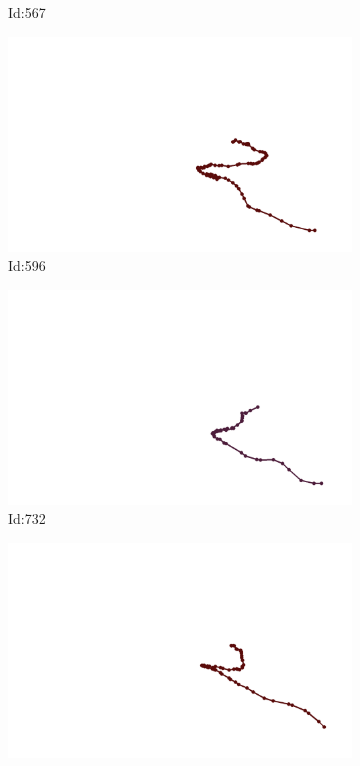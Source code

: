\documentclass[12pt,twoside]{report}
\begin{document}
\begin{figure}
\begin{subfigure}[b]{0.20\textwidth}
\caption{Id:567}
\end{subfigure}
\begin{subfigure}[b]{0.20\textwidth}
\centering
\includegraphics[width=\textwidth]{../../trajectories/596.png}
\caption{Id:596}
\end{subfigure}
\begin{subfigure}[b]{0.20\textwidth}
\centering
\includegraphics[width=\textwidth]{../../trajectories/732.png}
\caption{Id:732}
\end{subfigure}
\begin{subfigure}[b]{0.20\textwidth}
\centering
\includegraphics[width=\textwidth]{../../trajectories/918.png}

\end{subfigure}
\end{figure}
\end{document}
